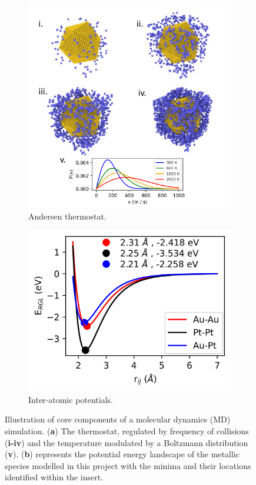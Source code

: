 \begin{figure}
\centering
\begin{subfigure}[b]{0.45\textwidth}
    \includegraphics[width=\textwidth]{figures/Theory/Thermo.pdf}
    \caption{Andersen thermostat.} 
    \label{Fig:thermostat}
\end{subfigure}
\begin{subfigure}[b]{0.5\textwidth}
    \includegraphics[width=\textwidth]{figures/Theory/Pots.png}
    \caption{Inter-atomic potentials.}
    \label{Fig:Gupta}
    \end{subfigure}
    \caption{Illustration of core components of a molecular dynamics (MD) simulation. (\textbf{a}) The thermostat, regulated by frequency of collisions (\textbf{i-iv}) and the temperature modulated by a Boltzmann distribution (\textbf{v}). (\textbf{b}) represents the potential energy landscape of the metallic species modelled in this project with the minima and their locations identified within the insert.}
    \label{Fig:Properties}
\end{figure}


